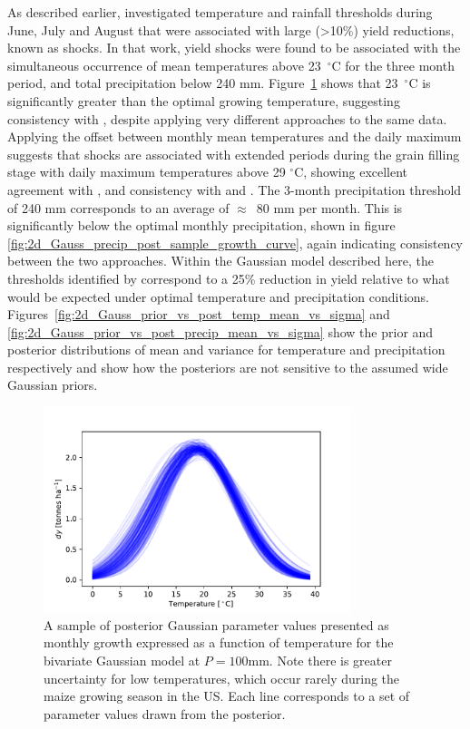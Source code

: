 \documentclass[12pt]{article}
\begin{document}
As described earlier, \cite{kent:2017} investigated temperature and rainfall thresholds during June, July and August that were associated with large (>10\%) yield reductions, known as shocks. In that work, yield shocks were found to be associated with the simultaneous occurrence of mean temperatures above 23~$^\circ$C for the three month period, and total precipitation below 240 mm. Figure~\ref{fig:2d_Gauss_temp_post_sample_growth_curve} shows that 23~$^\circ$C is significantly greater than the optimal growing temperature, suggesting consistency with \cite{kent:2017}, despite applying very different approaches to the same data. Applying the offset between monthly mean temperatures and the daily maximum suggests that shocks are associated with extended periods during the grain filling stage with daily maximum temperatures above 29 $^\circ$C, showing excellent agreement with \cite{schlenker:2009}, and consistency with \cite{sanchez:2014} and \cite{hatfield:2015}. The 3-month precipitation threshold of 240 mm corresponds to an average of $\approx$~80 mm per month. This is significantly below the optimal monthly precipitation, shown in figure \ref{fig:2d_Gauss_precip_post_sample_growth_curve}, again indicating consistency between the two approaches. Within the Gaussian model described here, the thresholds identified by \cite{kent:2017} correspond to a 25\% reduction in yield relative to what would be expected under optimal temperature and precipitation conditions. Figures~\ref{fig:2d_Gauss_prior_vs_post_temp_mean_vs_sigma} and 
\ref{fig:2d_Gauss_prior_vs_post_precip_mean_vs_sigma} show the prior and posterior distributions of mean and variance for temperature and precipitation respectively and show how the posteriors are not sensitive to the assumed wide Gaussian priors.

\begin{figure}
\centering
\includegraphics[width=0.8\textwidth]{./figures/2d_Gauss_temp_post_sample_growth_curve}
\caption{\label{fig:2d_Gauss_temp_post_sample_growth_curve} A sample of posterior Gaussian parameter values presented as monthly growth expressed as a function of temperature for the bivariate Gaussian model at $P = 100$mm. Note there is greater uncertainty for low temperatures, which occur rarely during the maize growing season in the US. Each line corresponds to a set of parameter values drawn from the posterior.}
\end{figure}
\end{document}
